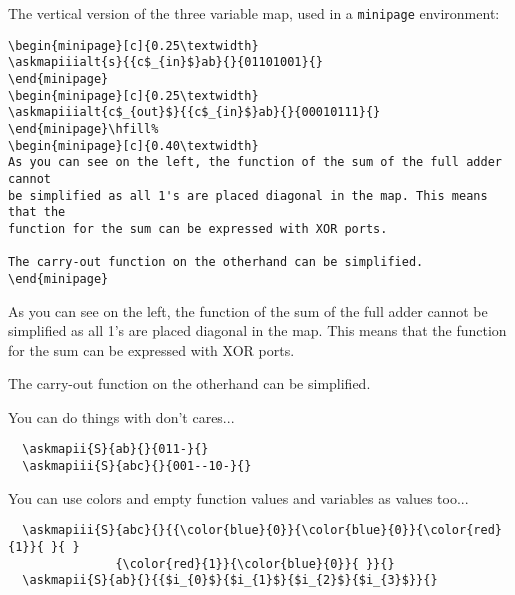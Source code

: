 \documentclass[a4paper,10pt]{ltxdoc}
\begin{document}
The vertical version of the three variable map, used in a \verb|minipage|
environment:
\begin{verbatim}
\begin{minipage}[c]{0.25\textwidth}
\askmapiiialt{s}{{c$_{in}$}ab}{}{01101001}{}
\end{minipage}
\begin{minipage}[c]{0.25\textwidth}
\askmapiiialt{c$_{out}$}{{c$_{in}$}ab}{}{00010111}{}
\end{minipage}\hfill%
\begin{minipage}[c]{0.40\textwidth}
As you can see on the left, the function of the sum of the full adder cannot
be simplified as all 1's are placed diagonal in the map. This means that the
function for the sum can be expressed with XOR ports.

The carry-out function on the otherhand can be simplified.
\end{minipage}
\end{verbatim}

\begin{minipage}[c]{0.25\textwidth}
\end{minipage}
\begin{minipage}[c]{0.25\textwidth}
\end{minipage}\hfill%
\begin{minipage}[c]{0.40\textwidth}
As you can see on the left, the function of the sum of the full adder cannot
be simplified as all 1's are placed diagonal in the map. This means that the
function for the sum can be expressed with XOR ports.

The carry-out function on the otherhand can be simplified.
\end{minipage}

\bigskip\bigskip


You can do things with don't cares...
\begin{verbatim}
  \askmapii{S}{ab}{}{011-}{}
  \askmapiii{S}{abc}{}{001--10-}{}
\end{verbatim}
\bigskip\bigskip

You can use colors and empty function values and variables as values too...
\begin{verbatim}
  \askmapiii{S}{abc}{}{{\color{blue}{0}}{\color{blue}{0}}{\color{red}{1}}{ }{ }
               {\color{red}{1}}{\color{blue}{0}}{ }}{}
  \askmapii{S}{ab}{}{{$i_{0}$}{$i_{1}$}{$i_{2}$}{$i_{3}$}}{}
\end{verbatim}
\bigskip
\end{document}

